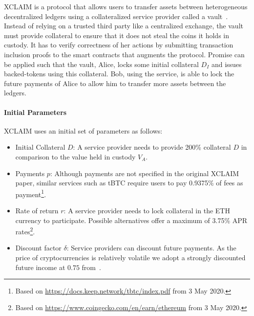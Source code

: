 \documentclass[runningheads]{llncs}
\newcommand{\sys}{Promise\xspace}
\begin{document}
XCLAIM is a protocol that allows users to transfer assets between heterogeneous decentralized ledgers using a collateralized service provider called a vault~\cite{Zamyatin2019XCLAIM}.
Instead of relying on a trusted third party like a centralized exchange, the vault must provide collateral to ensure that it does not steal the coins it holds in custody.
It has to verify correctness of her actions by submitting transaction inclusion proofs to the smart contracts that augments the protocol.
\sys can be applied such that the vault, Alice, locks some initial collateral $D_I$ and issues backed-tokens using this collateral.
Bob, using the service, is able to lock the future payments of Alice to allow him to transfer more assets between the ledgers.

\paragraph{Initial Parameters}
XCLAIM uses an initial set of parameters as follows:
\begin{itemize}
    \item Initial Collateral $D$: A service provider needs to provide 200\% collateral $D$ in comparison to the value held in custody $V_A$.
    \item Payments $p$: Although payments are not specified in the original XCLAIM paper, similar services such as tBTC require users to pay 0.9375\% of fees as payment\footnote{Based on \url{https://docs.keep.network/tbtc/index.pdf} from 3 May 2020.}.
    \item Rate of return $r$: A service provider needs to lock collateral in the ETH currency to participate. Possible alternatives offer a maximum of 3.75\% APR rates\footnote{Based on \url{https://www.coingecko.com/en/earn/ethereum} from 3 May 2020.}.
    \item Discount factor $\delta$: Service providers can discount future payments. As the price of cryptocurrencies is relatively volatile we adopt a strongly discounted future income at $0.75$ from~\cite{Harz2019Balance}.
\end{itemize}
\end{document}
